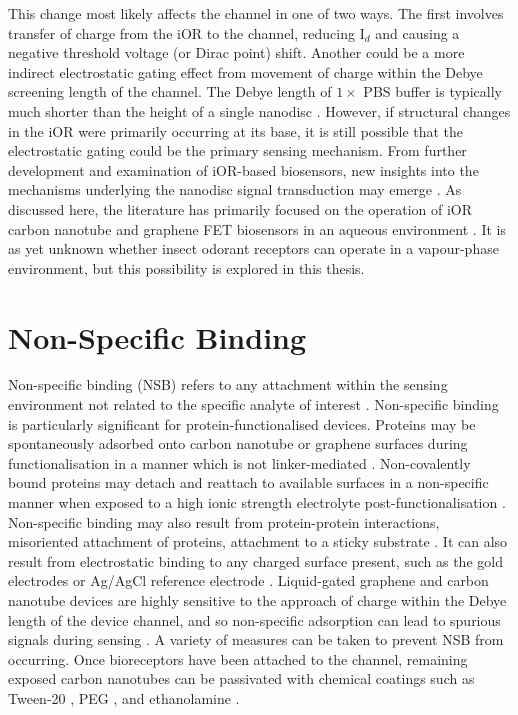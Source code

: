 \documentclass[
  a4paper,
]{scrbook}
\begin{document}
This change most likely affects the channel in one of two ways. The
first involves transfer of charge from the iOR to the channel, reducing
I\(_{d}\) and causing a negative threshold voltage (or Dirac point)
shift. Another could be a more indirect electrostatic gating effect from
movement of charge within the Debye screening length of the channel. The
Debye length of \(1 \times\) PBS buffer is typically much shorter than
the height of a single nanodisc \autocite{Murugathas2019a}. However, if
structural changes in the iOR were primarily occurring at its base, it
is still possible that the electrostatic gating could be the primary
sensing mechanism. From further development and examination of iOR-based
biosensors, new insights into the mechanisms underlying the nanodisc
signal transduction may emerge \autocite{Glatz2011}. As discussed here,
the literature has primarily focused on the operation of iOR carbon
nanotube and graphene FET biosensors in an aqueous environment
\autocite{Murugathas2019a,Murugathas2020}. It is as yet unknown whether
insect odorant receptors can operate in a vapour-phase environment, but
this possibility is explored in this thesis.

\hypertarget{sec-non-specific-binding}{%
\section{Non-Specific Binding}\label{sec-non-specific-binding}}

Non-specific binding (NSB) refers to any attachment within the sensing
environment not related to the specific analyte of interest
\autocite{Lichtenberg2019,Shkodra2021}. Non-specific binding is
particularly significant for protein-functionalised devices. Proteins
may be spontaneously adsorbed onto carbon nanotube or graphene surfaces
during functionalisation in a manner which is not linker-mediated
\autocite{Bradley2004,Star2003a,Chen2004}. Non-covalently bound proteins
may detach and reattach to available surfaces in a non-specific manner
when exposed to a high ionic strength electrolyte post-functionalisation
\autocite{Dung2018}. Non-specific binding may also result from
protein-protein interactions, misoriented attachment of proteins,
attachment to a sticky substrate \autocite{Chen2004,Lichtenberg2019}. It
can also result from electrostatic binding to any charged surface
present, such as the gold electrodes \autocite{Garcia-Aljaro2010} or
Ag/AgCl reference electrode
\autocite{Chen2004,Minot2007,Lichtenberg2019}. Liquid-gated graphene and
carbon nanotube devices are highly sensitive to the approach of charge
within the Debye length of the device channel, and so non-specific
adsorption can lead to spurious signals during sensing
\autocite{Star2003a,Chen2004,Lichtenberg2019,Shkodra2021}. A variety of
measures can be taken to prevent NSB from occurring. Once bioreceptors
have been attached to the channel, remaining exposed carbon nanotubes
can be passivated with chemical coatings such as Tween-20
\autocite{Chen2004}, PEG
\autocite{Star2003a,Lee2012b,Gao2016,Filipiak2018}, and ethanolamine
\autocite{Maehashi2007,Das2011}.
\end{document}
